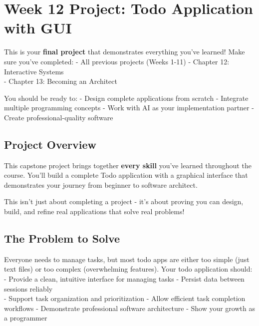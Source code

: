 \documentclass[
  letterpaper,
  DIV=11,
  numbers=noendperiod,
  oneside]{scrreprt}
\begin{document}
\chapter{Week 12 Project: Todo Application with
GUI}\label{sec-project-todo-gui}

\begin{tcolorbox}[enhanced jigsaw, opacityback=0, colback=white, colframe=quarto-callout-important-color-frame, breakable, titlerule=0mm, coltitle=black, rightrule=.15mm, colbacktitle=quarto-callout-important-color!10!white, left=2mm, bottomtitle=1mm, bottomrule=.15mm, title=\textcolor{quarto-callout-important-color}{\faExclamation}\hspace{0.5em}{Capstone Project - Before You Start}, opacitybacktitle=0.6, toptitle=1mm, leftrule=.75mm, arc=.35mm, toprule=.15mm]

This is your \textbf{final project} that demonstrates everything you've
learned! Make sure you've completed: - All previous projects (Weeks
1-11) - Chapter 12: Interactive Systems\\
- Chapter 13: Becoming an Architect

You should be ready to: - Design complete applications from scratch -
Integrate multiple programming concepts - Work with AI as your
implementation partner - Create professional-quality software

\end{tcolorbox}

\section{Project Overview}\label{project-overview-11}

This capstone project brings together \textbf{every skill} you've
learned throughout the course. You'll build a complete Todo application
with a graphical interface that demonstrates your journey from beginner
to software architect.

This isn't just about completing a project - it's about proving you can
design, build, and refine real applications that solve real problems!

\section{The Problem to Solve}\label{the-problem-to-solve-11}

Everyone needs to manage tasks, but most todo apps are either too simple
(just text files) or too complex (overwhelming features). Your todo
application should: - Provide a clean, intuitive interface for managing
tasks - Persist data between sessions reliably\\
- Support task organization and prioritization - Allow efficient task
completion workflows - Demonstrate professional software architecture -
Show your growth as a programmer
\end{document}
